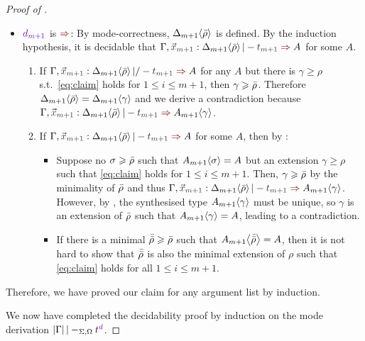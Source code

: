 \begin{proof}[Proof of {}]
\begin{itemize}
\begin{claimproof}
\begin{enumerate}
\begin{enumerate}
\begin{itemize}
                  \item $\dir{d_{m+1}}$ is $\syn$: By mode-correctness, ${\Delta_{m+1}}\!\left<{\bar{\rho}}\right>$ is defined.
                    By the induction hypothesis, it is decidable that $\Gamma, \vars{x}_\isTerm{m+1} : \simsub{\Delta_{m+1}}{\ext{\rho}} |- \isTerm{t_{m+1}} \syn A$ for some $A$.
                    \begin{enumerate}
                      \item If $\Gamma, \vars{x}_\isTerm{m+1} : \simsub{\Delta_{m+1}}{\ext{\rho}} |/- \isTerm{t_{m+1}} \syn A$ for any $A$ but there is $\gamma \geq \rho$ s.t.\ \eqref{eq:claim} holds for $1 \leq i \leq m+1$, then $\gamma \geqslant \bar{\rho}$.
                        Therefore ${\Delta_{m+1}}\!\left<{\bar{\rho}}\right> = {\Delta_{m+1}}\!\left<{\gamma}\right>$ and we derive a contradiction because $\Gamma, \vars{x}_\isTerm{m+1} : \simsub{\Delta_{m+1}}{\ext{\rho}} |- \isTerm{t_{m+1}} \syn \simsub{A_{m+1}}{\gamma}$.
                      \item If $\Gamma, \vars{x}_\isTerm{m+1} : \simsub{\Delta_{m+1}}{\ext{\rho}} |- \isTerm{t_{m+1}} \syn A$ for some $A$, then by : %
                        \begin{itemize}
                          \item Suppose no $\sigma \geqslant \bar{\rho}$ such that ${A_{m+1}}\!\left<{\sigma}\right> = A$ but an extension $\gamma \geq \rho$ such that \eqref{eq:claim} holds for $1 \leq i \leq m + 1$. 
                            Then, $\gamma \geqslant \bar{\rho}$ by the minimality of $\bar{\rho}$ and thus
                            $\Gamma, \vars{x}_\isTerm{m+1} : \simsub{\Delta_{m+1}}{\ext{\rho}} |- \isTerm{t_{m+1}} \syn \simsub{A_{m+1}}{\gamma}$.
                            However, by , the synthesised type ${A_{m+1}}\!\left<{\gamma}\right>$ must be unique, so $\gamma$ is an extension of $\bar{\rho}$ such that ${A_{m+1}}\!\left<{\gamma}\right> = A$, leading to a contradiction.
                          \item If there is a minimal $\bar{\bar{\rho}} \geqslant \bar{\rho}$ such that ${A_{m+1}}\!\left<{\bar{\bar{\rho}}}\right> = A$, then it is not hard to show that $\bar{\bar{\rho}}$ is also the minimal extension of $\rho$ such that \eqref{eq:claim} holds for all $1 \leq i \leq m + 1$.
                        \end{itemize}
                    \end{enumerate}
                \end{itemize}
            \end{enumerate}
        \end{enumerate}
        Therefore, we have proved our claim for any argument list by induction.
      \end{claimproof}
  \end{itemize}
  We now have completed the decidability proof by induction on the mode derivation $\erase{\Gamma} |-_{\Sigma, \Omega} t^{\dir{d}}$.
\end{proof}

